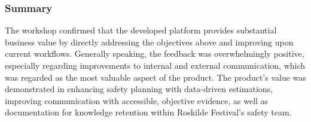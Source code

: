 \subsubsection{Summary}
The workshop confirmed that the developed platform provides substantial business value by directly addressing the objectives above and improving upon current workflows. Generally speaking, the feedback was overwhelmingly positive, especially regarding improvements to internal and external communication, which was regarded as the most valuable aspect of the product. The product's value was demonstrated in enhancing safety planning with data-driven estimations, improving communication with accessible, objective evidence, as well as documentation for knowledge retention within Roskilde Festival's safety team.
